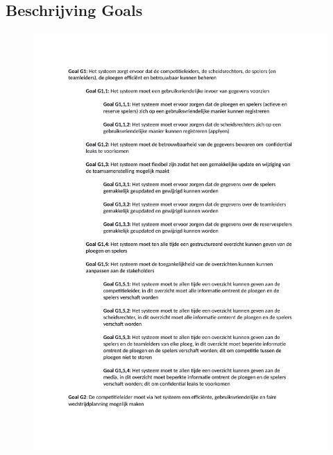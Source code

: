 \documentclass[12pt,a4paper]{article}
\begin{document}
			\subsection{Beschrijving Goals}
			\begin{figure}[H]
				\includegraphics[width=\textwidth]{../2-Doelen/Goals1.pdf}
			\end{figure}
			
\end{document}
